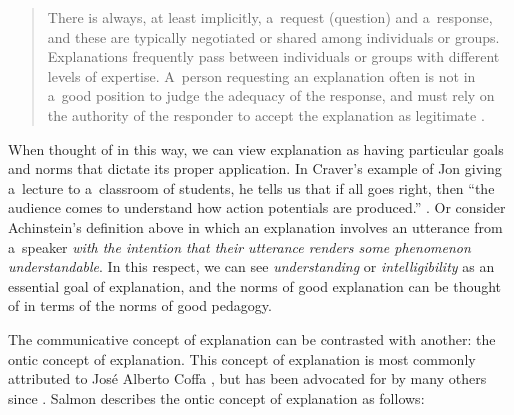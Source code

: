 \begin{quotation}
There is always, at least implicitly, a~request (question) and a~response, and these are typically negotiated or shared among individuals or groups. Explanations frequently pass between individuals or groups with different levels of expertise. A~person requesting an explanation often is not in a~good position to judge the adequacy of the response, and must rely on the authority of the responder to accept the explanation as legitimate
\parencite[][p.81]{woody_re-orienting_2015}.%


\end{quotation}
When thought of in this way, we can view explanation as having particular goals and norms that dictate its proper application. In Craver's example of Jon giving a~lecture to a~classroom of students, he tells us that if all goes right, then ``the audience comes to understand how action potentials are produced.''
\parencite[][p.30]{kaiser_ontic_2014}. %
 Or consider Achinstein's definition above in which an explanation involves an utterance from a~speaker \textit{with the intention that their utterance renders some phenomenon understandable}. In this respect, we can see \textit{understanding} or \textit{intelligibility} as an essential goal of explanation, and the norms of good explanation can be thought of in terms of the norms of good pedagogy.

The communicative concept of explanation can be contrasted with another: the ontic concept of explanation. This concept of explanation is most commonly attributed to José Alberto Coffa
\parencite*[][]{coffa_hempels_1974}, %
 but has been advocated for by many others since 
\parencites*[][]{salmon_four_1989}[][]{machamer_thinking_2000}[][]{craver_when_2006}[][]{izadi_building_2014}[][]{kaplan_explanation_2011}[][]{strevens_depth_2011}[][]{waskan_intelligibility_2011}[][]{povich_because_2018}[][]{craver_are_2020}. %
 Salmon describes the ontic concept of explanation as follows:

